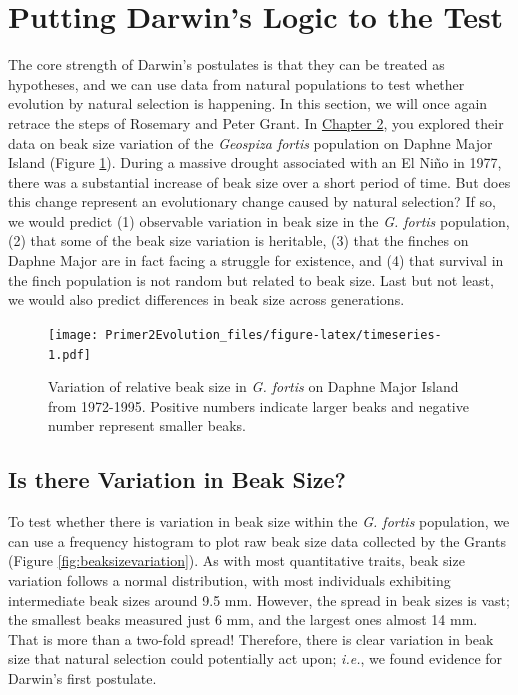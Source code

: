 \documentclass[
]{book}
\begin{document}
\hypertarget{putting-darwins-logic-to-the-test}{%
\section{Putting Darwin's Logic to the Test}\label{putting-darwins-logic-to-the-test}}

The core strength of Darwin's postulates is that they can be treated as hypotheses, and we can use data from natural populations to test whether evolution by natural selection is happening. In this section, we will once again retrace the steps of Rosemary and Peter Grant. In \href{evidence-for-evolution.html}{Chapter 2}, you explored their data on beak size variation of the \emph{Geospiza fortis} population on Daphne Major Island (Figure \ref{fig:timeseries}). During a massive drought associated with an El Niño in 1977, there was a substantial increase of beak size over a short period of time. But does this change represent an evolutionary change caused by natural selection? If so, we would predict (1) observable variation in beak size in the \emph{G. fortis} population, (2) that some of the beak size variation is heritable, (3) that the finches on Daphne Major are in fact facing a struggle for existence, and (4) that survival in the finch population is not random but related to beak size. Last but not least, we would also predict differences in beak size across generations.

\begin{figure}
\centering
\texttt{[image: Primer2Evolution\_files/figure-latex/timeseries-1.pdf]}
\caption{\label{fig:timeseries}Variation of relative beak size in \emph{G. fortis} on Daphne Major Island from 1972-1995. Positive numbers indicate larger beaks and negative number represent smaller beaks.}
\end{figure}

\hypertarget{is-there-variation-in-beak-size}{%
\subsection{Is there Variation in Beak Size?}\label{is-there-variation-in-beak-size}}

To test whether there is variation in beak size within the \emph{G. fortis} population, we can use a frequency histogram to plot raw beak size data collected by the Grants (Figure \ref{fig:beaksizevariation}). As with most quantitative traits, beak size variation follows a normal distribution, with most individuals exhibiting intermediate beak sizes around 9.5 mm. However, the spread in beak sizes is vast; the smallest beaks measured just 6 mm, and the largest ones almost 14 mm. That is more than a two-fold spread! Therefore, there is clear variation in beak size that natural selection could potentially act upon; \emph{i.e.}, we found evidence for Darwin's first postulate.
\end{document}
